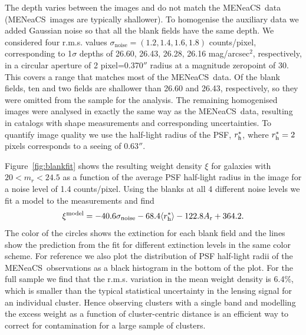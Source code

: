 \documentclass[useAMS,usenatbib]{mnras}
\newcommand{\mn}{MENeaCS}
\begin{document}
The depth varies between the images and do not match the \mn \ data (\mn \ images are typically shallower). To homogenise the auxiliary data we added Gaussian noise so that all the blank fields have the same depth. We considered four r.m.s. values $\sigma_\mathrm{noise}= (1.2, 1.4, 1.6, 1.8)$ counts/pixel, corresponding to 1$\sigma$ depths of 26.60, 26.43, 26.28, 26.16 mag/arcsec$^2$, respectively, in a circular aperture of 2 pixel=0.370$''$ radius at a magnitude zeropoint of 30. This covers a range that matches most of the \mn \ data. Of the blank fields, ten and two fields are shallower than 26.60 and 26.43, respectively, so they were omitted from the sample for the analysis. The remaining homogenised images were analysed in exactly the same way as the \mn \ data, resulting in catalogs with shape measurements and corresponding uncertainties. To quantify image quality we use the half-light radius of the PSF, $r^*_{\rm h}$, where $r^*_{\rm h}=2$ pixels corresponds to a seeing of 0.63$''$. 

Figure~\ref{fig:blankfit} shows the resulting weight density $\xi$ for galaxies with $20<m_r<24.5$ as a function of the average PSF half-light radius in the image for a noise level of 1.4 counts/pixel. Using the blanks at all 4 different noise levels we fit a model to the measurements and find 
\begin{equation}
\xi^\mathrm{model} = -40.6 \sigma_\mathrm{noise} -68.4  \langle r^*_{\rm h} \rangle -122.8 A_{\rm r} + 364.2 .
\label{eq:blank_fit}
\end{equation}
The color of the circles shows the extinction for each blank field and the lines show the prediction from the fit for different extinction levels in the same color scheme. For reference we also plot the distribution of PSF half-light radii of the \mn \ observations as a black histogram in the bottom of the plot.
For the full sample we find that the r.m.s. variation in the mean weight density is 6.4\%, which is smaller than the typical statistical uncertainty in the lensing signal for an individual cluster. Hence observing clusters with a single band and modelling the excess weight as a function of cluster-centric distance is an efficient way to correct for contamination for a large sample of clusters.
\end{document}
